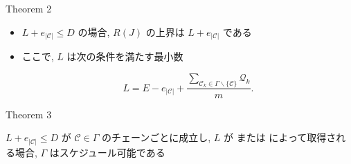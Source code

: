 \begin{frame}[label=theorem2]{Theorem 2}
    \begin{theorem}[]
        \begin{itemize}
            \item $L+e_{|\mathcal{C}|} \leq D$ の場合, $R(J)$ の上界は $L+e_{|\mathcal{C}|}$ である
            \item ここで, $L$ は次の条件を満たす最小数

            \begin{equation*}
                L=E-e_{|\mathcal{C}|}+\frac{\sum_{\mathcal{C}_{k} \in \Gamma \backslash\{\mathcal{C}\}} \mathcal{Q}_{k}}{m} .
            \end{equation*}
            \vspace{3mm}
        \end{itemize}
    \end{theorem}
\end{frame}

\begin{frame}[label=theorem3]{Theorem 3}
    \begin{theorem}[]
        $L+e_{|\mathcal{C}|} \leq D$ が $\mathcal{C} \in \Gamma$ のチェーンごとに成立し, $L$ が  または  によって取得される場合, $\Gamma$ はスケジュール可能である
    \end{theorem}
\end{frame}
